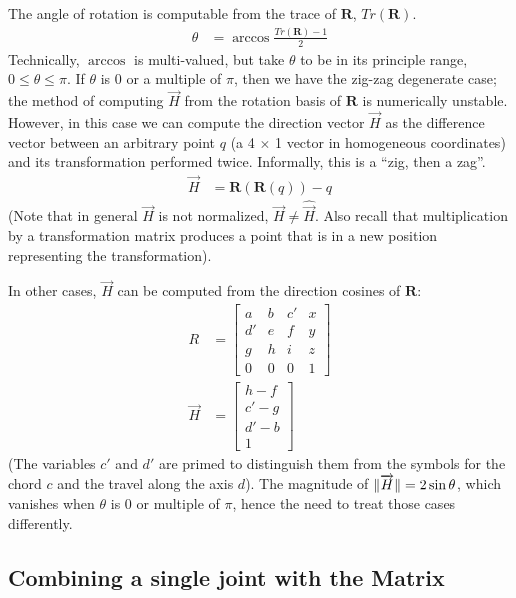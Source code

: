 \documentclass[11pt]{article}
\DeclarePairedDelimiter{\norm}{\lVert}{\rVert}
\begin{document}
{The angle of rotation is computable from the trace of $\bm{R}$, $Tr(\bm{R})$.
\begin{align}
  \theta &= \arccos{\frac{Tr(\bm{R}) - 1}{2}}
\end{align}
Technically, $\arccos$ is multi-valued, but take $\theta$
to be in its principle range, $0 \leq \theta \leq \pi$.
If $\theta$ is $0$ or a multiple of $\pi$, then we have the zig-zag
degenerate case; the method of computing $\overrightarrow{H}$ from the rotation
basis of $\bm{R}$ is numerically unstable.
However, in this case
we can compute the direction vector $\overrightarrow{H}$ as the difference vector
between an arbitrary point $q$ (a 4 $\times$ 1 vector in homogeneous coordinates)
and its transformation performed
twice. Informally, this is a ``zig, then a zag''.
\begin{align}
  \overrightarrow{H} &= \bm{R} ( \bm{R}( q)) - q
\end{align}
(Note that in general $\overrightarrow{H}$ is not normalized, $\overrightarrow{H} \neq \hat{\overrightarrow{H}}$.
Also recall that multiplication by a transformation matrix
produces a point that is in a new position representing
the transformation).

In other cases, $\overrightarrow{H}$ can be computed from the direction
cosines of $\bm{R}$\cite{wiki:rotation}:
\begin{align}
  R &=     \begin{bmatrix} a & b & c' & x \\ d' & e & f & y\\ g & h & i & z\\ 0 &  0 & 0 & 1\end{bmatrix} \\
    \overrightarrow{H} &=  \begin{bmatrix} h - f \\ c' - g \\ d' - b \\ 1 \end{bmatrix}
\end{align}
(The variables $c'$ and $d'$ are primed to distinguish them from
the symbols for the chord $c$ and the travel along the axis $d$).
The magnitude of $\norm{\overrightarrow{H}} = 2 \sin{\theta}$, which vanishes
when $\theta$ is $0$ or multiple of $\pi$, hence the need
to treat those cases differently.

\subsection{Combining a single joint with the Matrix}

}
\end{document}
